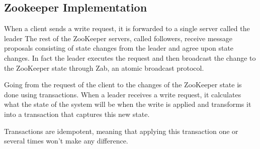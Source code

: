 \subsection{Zookeeper Implementation}

When a client sends a write request, it is forwarded to a single server called the leader The rest of the ZooKeeper servers, called followers, receive message proposals consisting of state changes from the leader and agree upon state changes. In fact the leader executes the request and then broadcast the change to the ZooKeeper state through Zab, an atomic broadcast protocol.

Going from the request of the client to the changes of the ZooKeeper state is done using transactions. When a leader receives a write request, it calculates what the state of the system will be when the write is applied and transforms it into a transaction that captures this new state.

Transactions are idempotent, meaning that applying this transaction one or several times won't make any difference.


